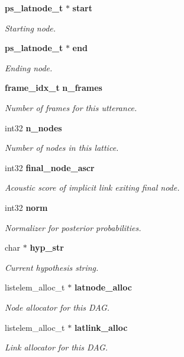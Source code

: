 \begin{DoxyCompactItemize}
{\bf ps\-\_\-latnode\-\_\-t} $\ast$ {\bf start}
\begin{DoxyCompactList}\small\item\em Starting node. \end{DoxyCompactList}\item 
{\bf ps\-\_\-latnode\-\_\-t} $\ast$ {\bf end}
\begin{DoxyCompactList}\small\item\em Ending node. \end{DoxyCompactList}\item 
{\bf frame\-\_\-idx\-\_\-t} {\bf n\-\_\-frames}
\begin{DoxyCompactList}\small\item\em Number of frames for this utterance. \end{DoxyCompactList}\item 
int32 {\bf n\-\_\-nodes}
\begin{DoxyCompactList}\small\item\em Number of nodes in this lattice. \end{DoxyCompactList}\item 
int32 {\bf final\-\_\-node\-\_\-ascr}
\begin{DoxyCompactList}\small\item\em Acoustic score of implicit link exiting final node. \end{DoxyCompactList}\item 
int32 {\bf norm}
\begin{DoxyCompactList}\small\item\em Normalizer for posterior probabilities. \end{DoxyCompactList}\item 
char $\ast$ {\bf hyp\-\_\-str}
\begin{DoxyCompactList}\small\item\em Current hypothesis string. \end{DoxyCompactList}\item 
listelem\-\_\-alloc\-\_\-t $\ast$ {\bf latnode\-\_\-alloc}
\begin{DoxyCompactList}\small\item\em Node allocator for this D\-A\-G. \end{DoxyCompactList}\item 
listelem\-\_\-alloc\-\_\-t $\ast$ {\bf latlink\-\_\-alloc}
\begin{DoxyCompactList}\small\item\em Link allocator for this D\-A\-G. \end{DoxyCompactList}\item 

\end{DoxyCompactItemize}
